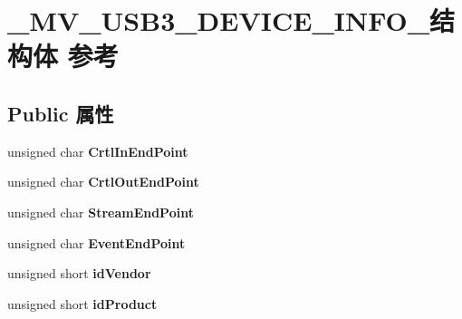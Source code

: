 \hypertarget{struct___m_v___u_s_b3___d_e_v_i_c_e___i_n_f_o__}{}\section{\+\_\+\+M\+V\+\_\+\+U\+S\+B3\+\_\+\+D\+E\+V\+I\+C\+E\+\_\+\+I\+N\+F\+O\+\_\+结构体 参考}
\label{struct___m_v___u_s_b3___d_e_v_i_c_e___i_n_f_o__}
\subsection*{Public 属性}
\begin{DoxyCompactItemize}
\item 
\mbox{\label{struct___m_v___u_s_b3___d_e_v_i_c_e___i_n_f_o___a257befd5681410c7a7a546f913b9b071}} 
unsigned char {\bfseries Crtl\+In\+End\+Point}
\item 
\mbox{\label{struct___m_v___u_s_b3___d_e_v_i_c_e___i_n_f_o___a666143c07239636d1c40f77e5a2b977f}} 
unsigned char {\bfseries Crtl\+Out\+End\+Point}
\item 
\mbox{\label{struct___m_v___u_s_b3___d_e_v_i_c_e___i_n_f_o___a8074d987175fd09a6dbf1f6d54e8c038}} 
unsigned char {\bfseries Stream\+End\+Point}
\item 
\mbox{\label{struct___m_v___u_s_b3___d_e_v_i_c_e___i_n_f_o___a5811c1c1926efb8a559a7155b99383d8}} 
unsigned char {\bfseries Event\+End\+Point}
\item 
\mbox{\label{struct___m_v___u_s_b3___d_e_v_i_c_e___i_n_f_o___a8ee688715c23deb7b6794fc736f138a2}} 
unsigned short {\bfseries id\+Vendor}
\item 
\mbox{\label{struct___m_v___u_s_b3___d_e_v_i_c_e___i_n_f_o___ae667535773400e1bc77cfd3e443b4ba3}} 
unsigned short {\bfseries id\+Product}
\item 
\mbox{\label{struct___m_v___u_s_b3___d_e_v_i_c_e___i_n_f_o___ac197ed4dbfaee3fcfcba4209d3d674c5}} 

\end{DoxyCompactItemize}
